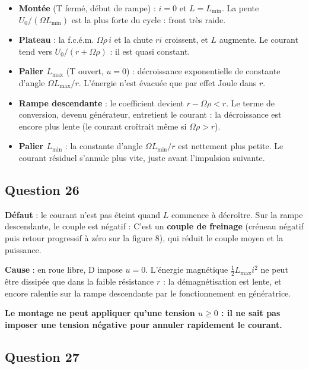 \documentclass[11pt,a4paper]{article}
\providecommand{\tightlist}{\setlength{\itemsep}{0pt}\setlength{\parskip}{0pt}}
\newcommand{\equationajustee}[1]{%
  \sbox{\boiteequation}{$\displaystyle #1$}%
  \ifdim\wd\boiteequation>\linewidth
    \[\resizebox{\linewidth}{!}{\usebox{\boiteequation}}\]%
  \else
    \[#1\]%
  \fi}
\begin{document}
\begin{itemize}
\tightlist
\item
  \textbf{Montée} (T fermé, début de rampe) : \(i=0\) et \(L=L_{\min}\). La pente \(U_0/(\Omega L_{\min})\) est la plus forte du cycle : front très raide.
\item
  \textbf{Plateau} : la f.c.é.m. \(\Omega\rho\,i\) et la chute \(ri\) croissent, et \(L\) augmente. Le courant tend vers \(U_0/(r+\Omega\rho)\) : il est quasi constant.
\item
  \textbf{Palier \(L_{\max}\)} (T ouvert, \(u=0\)) : décroissance exponentielle de constante d'angle \(\Omega L_{\max}/r\). L'énergie n'est évacuée que par effet Joule dans \(r\).
\item
  \textbf{Rampe descendante} : le coefficient devient \(r-\Omega\rho<r\). Le terme de conversion, devenu générateur, entretient le courant : la décroissance est encore plus lente (le courant croîtrait même si \(\Omega\rho>r\)).
\item
  \textbf{Palier \(L_{\min}\)} : la constante d'angle \(\Omega L_{\min}/r\) est nettement plus petite. Le courant résiduel s'annule plus vite, juste avant l'impulsion suivante.
\end{itemize}

\hypertarget{question-26}{%
\subsection{Question 26}\label{question-26}}

\textbf{Défaut} : le courant n'est pas éteint quand \(L\) commence à décroître. Sur la rampe descendante, le couple est négatif :
\equationajustee{\Gamma=\frac12i^2\frac{\mathrm dL}{\mathrm d\theta_{\mathrm r}}<0}
C'est un \textbf{couple de freinage} (créneau négatif puis retour progressif à zéro sur la figure 8), qui réduit le couple moyen et la puissance.

\textbf{Cause} : en roue libre, D impose \(u=0\). L'énergie magnétique \(\tfrac12L_{\max}i^2\) ne peut être dissipée que dans la faible résistance \(r\) : la démagnétisation est lente, et encore ralentie sur la rampe descendante par le fonctionnement en génératrice.

\textbf{Le montage ne peut appliquer qu'une tension \(u\ge0\) : il ne sait pas imposer une tension négative pour annuler rapidement le courant.}

\hypertarget{question-27}{%
\subsection{Question 27}\label{question-27}}
\end{document}

